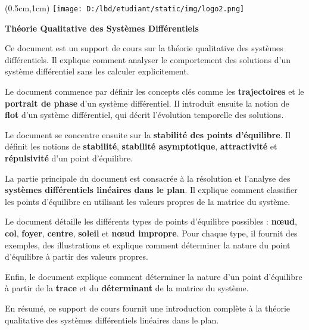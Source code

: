 \documentclass{article}
\begin{document}
\begin{textblock*}{3cm}(0.5cm,1cm)
    \texttt{[image: D:/lbd/etudiant/static/img/logo2.png]}
\end{textblock*}

\begin{center}
    \Large \textbf{Théorie Qualitative des Systèmes Différentiels}
\end{center}

\begin{boxgris}
Ce document est un support de cours sur la théorie qualitative des systèmes différentiels. Il explique comment analyser le comportement des solutions d'un système différentiel sans les calculer explicitement. 
\end{boxgris}

\begin{boxbleu}
Le document commence par définir les concepts clés comme les \textbf{trajectoires} et le \textbf{portrait de phase} d'un système différentiel. Il introduit ensuite la notion de \textbf{flot} d'un système différentiel, qui décrit l'évolution temporelle des solutions. 
\end{boxbleu}

\begin{boxgris}
Le document se concentre ensuite sur la \textbf{stabilité des points d'équilibre}. Il définit les notions de \textbf{stabilité}, \textbf{stabilité asymptotique}, \textbf{attractivité} et \textbf{répulsivité} d'un point d'équilibre.
\end{boxgris}

\begin{boxbleu}
La partie principale du document est consacrée à la résolution et l'analyse des \textbf{systèmes différentiels linéaires dans le plan}. Il explique comment classifier les points d'équilibre en utilisant les valeurs propres de la matrice du système. 
\end{boxbleu}

\begin{boxgris}
Le document détaille les différents types de points d'équilibre possibles : \textbf{nœud}, \textbf{col}, \textbf{foyer}, \textbf{centre}, \textbf{soleil} et \textbf{nœud impropre}. Pour chaque type, il fournit des exemples, des illustrations et explique comment déterminer la nature du point d'équilibre à partir des valeurs propres. 
\end{boxgris}

Enfin, le document explique comment déterminer la nature d'un point d'équilibre à partir de la \textbf{trace} et du \textbf{déterminant} de la matrice du système.

\begin{boxbleu}[Conclusion]
En résumé, ce support de cours fournit une introduction complète à la théorie qualitative des systèmes différentiels linéaires dans le plan. 
\end{boxbleu}
\end{document}
